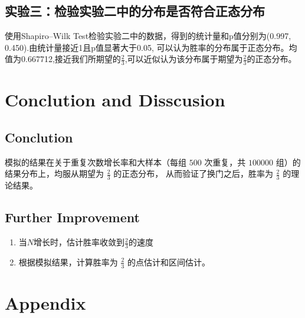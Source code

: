\documentclass[12pt]{article}
\begin{document}
\subsection{实验三：检验实验二中的分布是否符合正态分布}
使用Shapiro–Wilk Test检验实验二中的数据，得到的统计量和p值分别为(0.997, 0.450).由统计量接近1且p值显著大于0.05,
可以认为胜率的分布属于正态分布。均值为0.667712,接近我们所期望的$\frac{2}{3}$,可以近似认为该分布属于期望为$\frac{2}{3}$的正态分布。
\section{Conclution and Disscusion}
\subsection{Conclution}
模拟的结果在关于重复次数增长率和大样本（每组 $500$ 次重复，共 $100000$ 组）的结果分布上，均服从期望为 $\frac{2}{3}$ 的正态分布，
从而验证了换门之后，胜率为 $\frac{2}{3}$ 的理论结果。


\subsection{Further Improvement}
\begin{enumerate}
\item 当$N$增长时，估计胜率收敛到$\frac{2}{3}$的速度
\item 根据模拟结果，计算胜率为 $\frac{2}{3}$ 的点估计和区间估计。
\end{enumerate}



\section*{Appendix}
\end{document}
